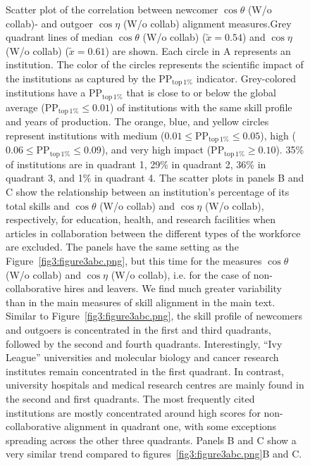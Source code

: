 \documentclass[draft,final]{vutinfth} %
\begin{document}
\begin{figure} [!ht]
\caption{Scatter plot of the correlation between newcomer $\cos{\theta}$ (W/o collab)- and outgoer $\cos{\eta}$ (W/o collab) alignment measures.Grey quadrant lines of median $\cos{\theta}$ (W/o collab) ($\tilde{x}=0.54$) and $\cos{\eta}$ (W/o collab) ($\tilde{x}=0.61$) are shown. Each circle in A represents an institution. The color of the circles represents the scientific impact of the institutions as captured by the PP$_\mathrm{top\,1\%}$ indicator. Grey-colored institutions have a PP$_\mathrm{top\,1\%}$ that is close to or below the global average (PP$_\mathrm{top\,1\%}\leq{0.01}$) of institutions with the same skill profile and years of production. The orange, blue, and yellow circles represent institutions with medium ($0.01\leq \mathrm{PP}_\mathrm{top\,1\%}\leq{0.05}$), high ($0.06\leq\mathrm{PP}_\mathrm{top\,1\%}\leq{0.09}$), and very high impact (PP$_\mathrm{top\,1\%}\geq{0.10}$). 35\% of institutions are in quadrant 1, 29\% in quadrant 2, 36\% in quadrant 3, and 1\% in quadrant 4. The scatter plots in panels B and C show the relationship between an institution's percentage of its total skills and $\cos{\theta}$ (W/o collab) and $\cos{\eta}$ (W/o collab), respectively, for education, health, and research facilities when articles in collaboration between the different types of the workforce are excluded. The panels have the same setting as the Figure~\ref{fig3:figure3abc.png}, but this time for the measures $\cos\theta$ (W/o collab) and $\cos\eta$ (W/o collab), i.e. for the case of non-collaborative hires and leavers. We find much greater variability than in the main measures of skill alignment in the main text. Similar to Figure~\ref{fig3:figure3abc.png}, the skill profile of newcomers and outgoers is concentrated in the first and third quadrants, followed by the second and fourth quadrants. Interestingly, ``Ivy League'' universities and molecular biology and cancer research institutes remain concentrated in the first quadrant. In contrast, university hospitals and medical research centres are mainly found in the second and first quadrants. The most frequently cited institutions are mostly concentrated around high scores for non-collaborative alignment in quadrant one, with some exceptions spreading across the other three quadrants. Panels B and C show a very similar trend compared to figures~\ref{fig3:figure3abc.png}B and C.
}
\label{SI:figure3abc_wo_collaboration.png}
\end{figure}
\end{document}
